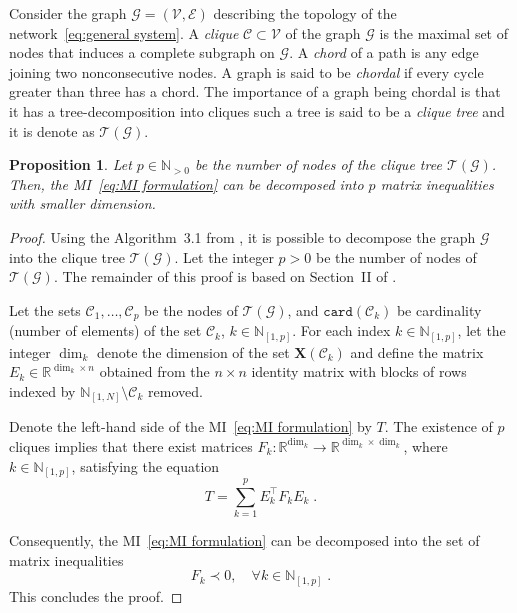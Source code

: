 \documentclass[10pt,twocolumn,twoside]{IEEEtran}
\theoremstyle{plain}
\newtheorem{proposition}{Proposition}
\theoremstyle{definition}
\theoremstyle{remark}
\begin{document}
Consider the graph $\mathscr{G}=(\mathscr{V},\mathscr{E})$ describing the topology of the network~\eqref{eq:general system}. A \emph{clique} $\mathscr{C}\subset\mathscr{V}$ of the graph $\mathscr{G}$ is the maximal set of nodes that induces a complete subgraph on $\mathscr{G}$. A \emph{chord} of a path is any edge joining two nonconsecutive nodes. A graph is said to be \emph{chordal} if every cycle greater than three has a chord. The importance of a graph being chordal is that it has a tree-decomposition into cliques  \cite[Proposition~12.3.11]{Diestel2005} such a tree is said to be a \emph{clique tree} and it is denote as $\mathscr{T}(\mathscr{G})$.

\begin{proposition}\label{prop:clique tree decomposition}
	Let $p\in\mathbb{N}_{>0}$ be the number of nodes of the clique tree $\mathscr{T}(\mathscr{G})$. Then, the MI~\eqref{eq:MI formulation} can be decomposed into $p$ matrix inequalities with smaller dimension.
\end{proposition}

\begin{proof}
	Using the Algorithm~3.1 from \cite{VandenbergheAndersen2015}, it is possible to decompose the graph $\mathscr{G}$ into the clique tree $\mathscr{T}(\mathscr{G})$. Let the integer $p>0$ be the number of nodes of $\mathscr{T}(\mathscr{G})$. The remainder of this proof is based on Section~II of \cite{PakazadHanssonAndersenEtAl2015}.
	
	Let the sets $\mathscr{C}_1,\ldots,\mathscr{C}_p$ be the nodes of $\mathscr{T}(\mathscr{G})$, and $\mathbin{\mathtt{card}}(\mathscr{C}_k)$ be cardinality (number of elements) of the set $\mathscr{C}_k$, $k\in\mathbb{N}_{[1,p]}$. For each index $k\in\mathbb{N}_{[1,p]}$, let the integer $\dim_k$ denote the dimension of the set $\mathbf{X}(\mathscr{C}_k)$ and define the matrix $E_k\in\mathbb{R}^{\dim_k\times n}$ obtained from the $n\times n$ identity matrix with blocks of rows indexed by $\mathbb{N}_{[1,N]}\setminus \mathscr{C}_k$ removed.
	
   Denote the left-hand side of the MI~\eqref{eq:MI formulation} by $T$. The existence of $p$ cliques implies that there exist matrices $F_k:\mathbb{R}^{\dim_k}\to\mathbb{R}^{\dim_k\times \dim_k}$, where $k\in\mathbb{N}_{[1,p]}$, satisfying the equation
   \begin{equation*}
   	 T=\sum_{k=1}^p E_k^\top F_k E_k\;.
  	\end{equation*}
  	
  	Consequently, the MI~\eqref{eq:MI formulation} can be decomposed into the set of matrix inequalities
  	\begin{equation}\label{eq:MIF}
  		F_k\prec0,\quad\forall k\in\mathbb{N}_{[1,p]}\;.
	\end{equation}
	This concludes the proof.
\end{proof}
\end{document}
